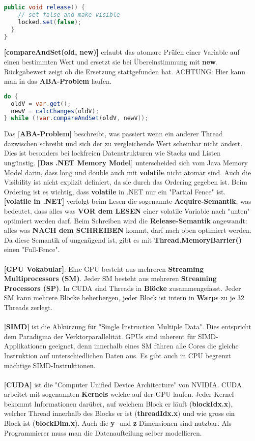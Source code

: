 \documentclass[8pt]{extarticle}
\let\oldtextbf\textbf
\renewcommand{\textbf}{\tiny\oldtextbf}
\begin{document}
\begin{multicols*}{5}
\begin{lstlisting}[language=java]
  public void release() {
    // set false and make visible
    locked.set(false);
  }
}
\end{lstlisting}
\textbf{[compareAndSet(old, new)]} erlaubt das atomare Prüfen einer Variable auf einen bestimmten Wert und ersetzt sie bei Übereinstimmung mit \textbf{new}. Rückgabewert zeigt ob die Ersetzung stattgefunden hat. ACHTUNG: Hier kann man in das \textbf{ABA-Problem} laufen.
\begin{lstlisting}[language=java]
do {
  oldV = var.get();
  newV = calcChanges(oldV);
} while (!var.compareAndSet(oldV, newV));
\end{lstlisting}
Das \textbf{[ABA-Problem]} beschreibt, was passiert wenn ein anderer Thread dazwischen schreibt und sich der zu vergleichende Wert scheinbar nicht ändert. Dies ist besonders bei lockfreien Datenstrukturen wie Stacks und Listen ungünstig.
\textbf{[Das .NET Memory Model]} unterscheided sich vom Java Memory Model darin, dass long und double auch mit \textbf{volatile} nicht atomar sind. Auch die Visibility ist nicht explizit definiert, da sie durch das Ordering gegeben ist. Beim Ordering ist es wichtig, dass \textbf{volatile} in .NET nur ein "Partial Fence" ist.
\textbf{[volatile in .NET]} verfolgt beim Lesen die sogenannte \textbf{Acquire-Semantik}, was bedeutet, dass alles was \textbf{VOR dem LESEN} einer volatile Variable nach "unten" optimiert werden darf. Beim Schreiben wird die \textbf{Release-Semantik} angewandt: alles was \textbf{NACH dem SCHREIBEN} kommt, darf nach oben optimiert werden. Da diese Semantik of ungenügend ist, gibt es mit \textbf{Thread.MemoryBarrier()} einen "Full-Fence".\\\\
\textbf{[GPU Vokabular]}: Eine GPU besteht aus mehreren \textbf{Streaming Multiprocessors (SM)}. Jeder SM besteht aus mehreren \textbf{Streaming Processors (SP)}. In CUDA sind Threads in \textbf{Blöcke} zusammengefasst. Jeder SM kann mehrere Blöcke beherbergen, jeder Block ist intern in \textbf{Warp}s zu je 32 Threads zerlegt.\\\\
\textbf{[SIMD]} ist die Abkürzung für "Single Instruction Multiple Data". Dies entspricht dem Paradigma der Verktorparallelität. GPUs sind inherent für SIMD-Applikationen geeignet, denn innerhalb eines SM führen alle Cores die gleiche Instruktion auf unterschiedlichen Daten aus. Es gibt auch in CPU begrenzt mächtige SIMD-Instruktionen.\\\\
\textbf{[CUDA]} ist die "Computer Unified Device Architecture" von NVIDIA. CUDA arbeitet mit sogenannten \textbf{Kernels} welche auf der GPU laufen. Jeder Kernel bekommt Informationen darüber, auf welchem Block er läuft (\textbf{blockIdx.x}), welcher Thread innerhalb des Blocks er ist (\textbf{threadIdx.x}) und wie gross ein Block ist (\textbf{blockDim.x}). Auch die \textbf{y}- und \textbf{z}-Dimensionen sind nutzbar. Als Programmierer muss man die Datenaufteilung selber modellieren.

\end{multicols*}
\end{document}
